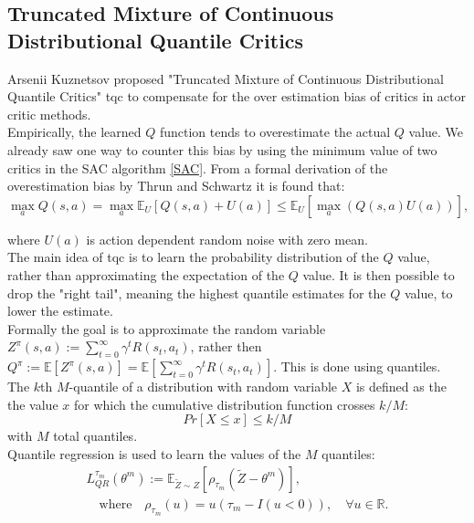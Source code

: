 \subsection{Truncated Mixture of Continuous Distributional Quantile Critics}
\label{section:TQC}
Arsenii Kuznetsov \etAl proposed "Truncated Mixture of Continuous Distributional Quantile Critics" \ac{tqc} \cite{TQC_Paper} to compensate for the over estimation bias of critics in actor critic methods.\\
Empirically, the learned $Q$ function tends to overestimate the actual $Q$ value. We already saw one way to counter this bias by using the minimum value of 
two critics in the SAC algorithm \ref{SAC}. From a formal derivation of the overestimation bias by 
Thrun and Schwartz \cite{thrun1993issues} it is found that:
\begin{equation}
    \label{eq:overestimation}
    \max_a Q(s,a) = \max_a \mathbb{E}_{U}\left[Q(s,a) + U(a)\right] \leq \mathbb{E}_{U}\left[\max_a \left( Q(s,a)  U(a)\right)\right],
\end{equation}

where $U(a)$ is action dependent random noise with zero mean. \\
The main idea of \ac{tqc} is to learn the probability distribution of the $Q$ value, rather than approximating the expectation of the $Q$ value. 
It is then possible to drop the "right tail", meaning the highest quantile estimates for the $Q$ value, to lower the estimate.\\
Formally the goal is to approximate the random variable $Z^\pi(s,a):=\sum_{t=0}^\infty\gamma^tR(s_t, a_t)$, rather then 
$Q^\pi  := \mathbb{E}[Z^\pi(s,a)] = \mathbb{E}[\sum_{t=0}^\infty\gamma^tR(s_t, a_t)]$. This is done using quantiles.\\
The $k$th $M$-quantile of a distribution with random variable $X$ is defined as the the value $x$ for which the cumulative distribution function crosses $k/M$:
\begin{equation}
    Pr[X \leq x] \leq k/M
\end{equation}
with $M$ total quantiles. \\
Quantile regression is used to learn the values of the $M$ quantiles:
\begin{align}
    \label{rho}
    L^{\tau_m}_{QR}(\theta^m) := \mathbb{E}_{\tilde{Z}\sim Z}\left[\rho_{\tau_m}(\tilde{Z}-\theta^m)\right],\\
    \quad \text{where} \quad \rho_{\tau_m}(u) = u({\tau_m} - I(u < 0)), \quad \forall u \in \mathbb{R}.
\end{align}
    
